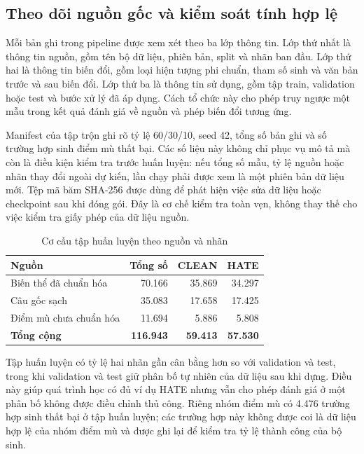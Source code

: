 \documentclass[12pt,a4paper]{article}
\begin{document}
\subsection{Theo dõi nguồn gốc và kiểm soát tính hợp lệ}
Mỗi bản ghi trong pipeline được xem xét theo ba lớp thông tin. Lớp thứ nhất là thông tin nguồn, gồm tên bộ dữ liệu, phiên bản, split và nhãn ban đầu. Lớp thứ hai là thông tin biến đổi, gồm loại hiện tượng phi chuẩn, tham số sinh và văn bản trước và sau biến đổi. Lớp thứ ba là thông tin sử dụng, gồm tập train, validation hoặc test và bước xử lý đã áp dụng. Cách tổ chức này cho phép truy ngược một mẫu trong kết quả đánh giá về nguồn và phép biến đổi tương ứng.

Manifest của tập trộn ghi rõ tỷ lệ 60/30/10, seed 42, tổng số bản ghi và số trường hợp sinh điểm mù thất bại. Các số liệu này không chỉ phục vụ mô tả mà còn là điều kiện kiểm tra trước huấn luyện: nếu tổng số mẫu, tỷ lệ nguồn hoặc nhãn thay đổi ngoài dự kiến, lần chạy phải được xem là một phiên bản dữ liệu mới. Tệp mã băm SHA-256 được dùng để phát hiện việc sửa dữ liệu hoặc checkpoint sau khi đóng gói. Đây là cơ chế kiểm tra toàn vẹn, không thay thế cho việc kiểm tra giấy phép của dữ liệu nguồn.

\begin{table}[H]
\centering
\caption{Cơ cấu tập huấn luyện theo nguồn và nhãn}
\label{tab:train-composition}
\begin{tabular}{lrrr}
\toprule
\textbf{Nguồn} & \textbf{Tổng số} & \textbf{CLEAN} & \textbf{HATE}\\
\midrule
Biến thể đã chuẩn hóa & 70.166 & 35.869 & 34.297\\
Câu gốc sạch & 35.083 & 17.658 & 17.425\\
Điểm mù chưa chuẩn hóa & 11.694 & 5.886 & 5.808\\
\textbf{Tổng cộng} & \textbf{116.943} & \textbf{59.413} & \textbf{57.530}\\
\bottomrule
\end{tabular}
\end{table}

Tập huấn luyện có tỷ lệ hai nhãn gần cân bằng hơn so với validation và test, trong khi validation và test giữ phân bố tự nhiên của dữ liệu sau khi dựng. Điều này giúp quá trình học có đủ ví dụ HATE nhưng vẫn cho phép đánh giá ở một phân bố không được điều chỉnh thủ công. Riêng nhóm điểm mù có 4.476 trường hợp sinh thất bại ở tập huấn luyện; các trường hợp này không được coi là dữ liệu hợp lệ của nhóm điểm mù và được ghi lại để kiểm tra tỷ lệ thành công của bộ sinh.
\end{document}
